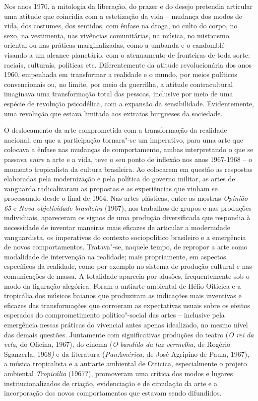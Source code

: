 Nos anos 1970, a mitologia da liberação, do prazer e do desejo pretendia
articular uma atitude que coincidia com a estetização da vida -- mudança
dos modos de vida, dos costumes, dos sentidos, com ênfase na droga, no
culto do corpo, no sexo, na vestimenta, nas vivências comunitárias, na
música, no misticismo oriental ou nas práticas marginalizadas, como a
umbanda e o candomblé -- visando a um alcance planetário, com o
atenuamento de fronteiras de toda sorte: raciais, culturais, políticas
etc. Diferentemente da atitude revolucionária dos anos 1960, empenhada
em transformar a realidade e o mundo, por meios políticos convencionais
ou, no limite, por meio da guerrilha, a atitude contracultural imaginava
uma transformação total das pessoas, inclusive por meio de uma espécie
de revolução psicodélica, com a expansão da sensibilidade.
Evidentemente, uma revolução que estava limitada aos extratos burgueses
da sociedade.

O deslocamento da arte comprometida com a transformação da realidade
nacional, em que a participação tornara"-se um imperativo, para uma arte
que colocava a ênfase nas mudanças de comportamento, ambas interpretando
o que se passava \emph{entre} a arte e a vida, teve o seu ponto de
inflexão nos anos 1967-1968 -- o momento tropicalista da cultura
brasileira. Ao colocarem em questão as respostas elaboradas pela
modernização e pela política do governo militar, as artes de vanguarda
radicalizaram as propostas e as experiências que vinham se processando
desde o final de 1964. Nas artes plásticas, entre as mostras
\emph{Opinião 65} e \emph{Nova objetividade brasileira} (1967), nos
trabalhos de grupos e nas produções individuais, apareceram os signos de
uma produção diversificada que respondia à necessidade de inventar
maneiras mais eficazes de articular a modernidade vanguardista, os
imperativos do contexto sociopolítico brasileiro e a emergência de novos
comportamentos. Tratava"-se, naquele tempo, de repropor a arte como
modalidade de intervenção na realidade; mais propriamente, em aspectos
específicos da realidade, como por exemplo no sistema de produção
cultural e nas comunicações de massa. A totalidade aparecia por alusões,
frequentemente sob o modo da figuração alegórica. Foram a antiarte
ambiental de Hélio Oiticica e a tropicália dos músicos baianos que
produziram as indicações mais inventivas e eficazes das transformações
que corroeram as expectativas usuais sobre os efeitos esperados do
comprometimento político"-social das artes -- inclusive pela emergência
nessas práticas do vivencial antes apenas idealizado, no mesmo nível das
demais questões. Juntamente com significativas produções do teatro
(\emph{O rei da vela,} do Oficina, 1967), do cinema (\emph{O bandido da
luz vermelha,} de Rogério Sganzerla, 1968\emph{)} e da literatura
(\emph{PanAmérica,} de José Agripino de Paula, 1967), a música
tropicalista e a antiarte ambiental de Oiticica, especialmente o projeto
ambiental \emph{Tropicália} (1967?), promoveram uma crítica dos modos e %
lugares institucionalizados de criação, evidenciação e de circulação da
arte e a incorporação dos novos comportamentos que estavam sendo
difundidos.

